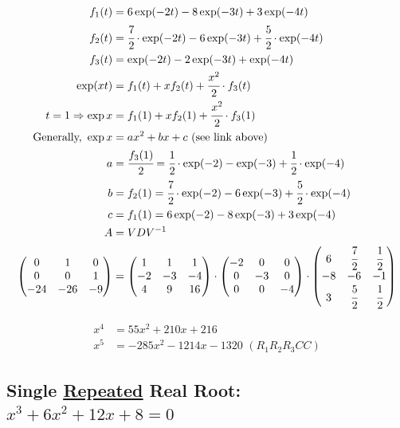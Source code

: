\documentclass[12pt,a4paper]{article}
\begin{document}
\begin{align}
f_1(t) &= 6 \exp(-2t) -8 \exp(-3t) + 3 \exp(-4t) \\
f_2(t) &= \cfrac{7}{2} \cdot \exp(-2t) - 6 \exp(-3t) + \cfrac{5}{2} \cdot \exp(-4t) \\
f_3(t) &= \exp(-2t) - 2 \exp(-3t) + \exp(-4t) \\
\exp (xt) &= f_1(t) + x f_2(t) + \cfrac{x^2}{2} \cdot f_3(t) \\
t = 1 \Rightarrow \exp x &= f_1(1) + x f_2(1) + \cfrac{x^2}{2} \cdot f_3(1) \\
\text{Generally, } \exp x &= ax^2 + bx + c \text{ (see link above)} \\
a &= \cfrac{f_3(1)}{2} = \cfrac{1}{2} \cdot \exp(-2) - \exp(-3) + \cfrac{1}{2} \cdot \exp(-4) \\
b &= f_2(1) = \cfrac{7}{2} \cdot \exp(-2) - 6 \exp(-3) + \cfrac{5}{2} \cdot \exp(-4) \\
c &= f_1(1) = 6 \exp(-2) -8 \exp(-3) + 3 \exp(-4) \\
A &= VDV^{-1} \\
\left( \begin{matrix} 0 & 1 & 0 \\ 0 & 0 & 1 \\ -24 & -26 & -9 \end{matrix} \right)
&=
\left( \begin{matrix}  1 & 1 & 1 \\ -2 & -3 & -4 \\ 4 & 9 & 16  \end{matrix} \right) \cdot
\left( \begin{matrix} -2 & 0 & 0 \\  0 & -3 & 0 \\ 0 & 0 & -4  \end{matrix} \right) \cdot
\left( \begin{matrix}  6 & \cfrac{7}{2} & \cfrac{1}{2} \\ -8 & -6 & -1 \\ 3 & \cfrac{5}{2} & \cfrac{1}{2} \end{matrix} \right)
\end{align}

\begin{align}
x^4 &= 55x^2 + 210x + 216 \\
x^5 &= - 285x^2 - 1214x - 1320\,\,(R_1R_2R_3CC)
\end{align}

\subsection{Single \href{https://www.wolframalpha.com/input/?i=\%7B\%7B1,0,0\%7D,+\%7Bb,1,0\%7D,+\%7Bb\%5E2,2*b,1\%7D\%7D+*+\%7B\%7Bb,1,0\%7D,+\%7B0,b,1\%7D,+\%7B0,0,b\%7D\%7D+*+inv+\%7B\%7B1,0,0\%7D,+\%7Bb,1,0\%7D,+\%7Bb\%5E2,2*b,1\%7D\%7D}{\color{blue}\underline{Repeated}} Real Root: $x^3 + 6x^2 + 12x + 8 = 0$}
\end{document}

